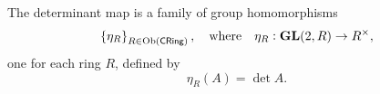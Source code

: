 \documentclass[11pt,openany]{article}
\begin{document}
\begin{example}[Determinant]
\begin{enumerate}
	The determinant map is a family of group homomorphisms \[
	\set{\eta_R}_{R\in\text{Ob}(\mathsf{CRing})},\quad \text{where}\quad \eta_R:\textbf{GL}(2,R)\to R^{\times},
	\] one for each ring $R$, defined by \[
	\eta_R(A)=\det A.
	\]
\end{enumerate}
\vfill
\begin{figure}[h!]\centering
\end{figure}


\end{example}
\end{document}
